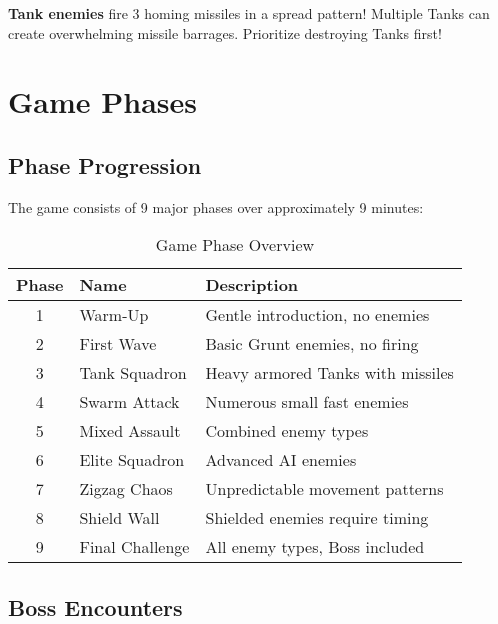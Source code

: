 \documentclass[11pt,a4paper]{article}
\begin{document}
\begin{tcolorbox}[colback=warningcolor!10, colframe=warningcolor, title=\faExclamationTriangle~Watch Out!]
\textbf{Tank enemies} fire 3 homing missiles in a spread pattern! Multiple Tanks can create overwhelming missile barrages. Prioritize destroying Tanks first!
\end{tcolorbox}

\section{Game Phases}

\subsection{Phase Progression}

The game consists of 9 major phases over approximately 9 minutes:

\begin{table}[h]
\centering
\small
\begin{tabularx}{\textwidth}{|c|l|X|}
\hline
\rowcolor{primarycolor!20}
\textbf{Phase} & \textbf{Name} & \textbf{Description} \\
\hline
1 & Warm-Up & Gentle introduction, no enemies \\
\hline
2 & First Wave & Basic Grunt enemies, no firing \\
\hline
3 & Tank Squadron & Heavy armored Tanks with missiles \\
\hline
4 & Swarm Attack & Numerous small fast enemies \\
\hline
5 & Mixed Assault & Combined enemy types \\
\hline
6 & Elite Squadron & Advanced AI enemies \\
\hline
7 & Zigzag Chaos & Unpredictable movement patterns \\
\hline
8 & Shield Wall & Shielded enemies require timing \\
\hline
9 & Final Challenge & All enemy types, Boss included \\
\hline
\end{tabularx}
\caption{Game Phase Overview}
\end{table}

\subsection{Boss Encounters}
\end{document}
